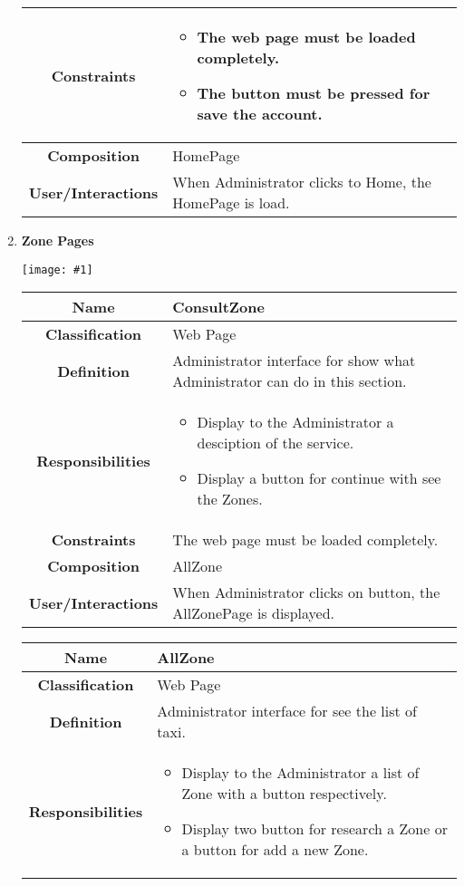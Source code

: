 \documentclass[11pt, a4paper,titlepage]{article}
\newcommand{\image}[1]{
	\begin{center}
		\noindent \texttt{[image: \#1]}
	\end{center}
	}
\begin{document}
\begin{enumerate}
\begin{tabularx}{\textwidth}{| c | X |}
	\hline
	\textbf{Constraints} &
	\begin{itemize}
		\item The web page must be loaded completely.
		\item The button must be pressed for save the account.
	\end{itemize}
	\\
	\hline
	\textbf{Composition} & HomePage
	\\
	\hline
	\textbf{User/Interactions} & When Administrator clicks to Home, the HomePage is load.
	\\
	\hline 
\end{tabularx}
\newpage
\item \textbf{Zone Pages}\\
\image{page_zone.png}
\begin{tabularx}{\textwidth}{| c | X |}
	\hline
	\textbf{Name} &
	ConsultZone
	\\
	\hline
	\textbf{Classification} &
	Web Page
	\\
	\hline
	\textbf{Definition} &
	Administrator interface for show what Administrator can do in this section.\\
	\hline
	\textbf{Responsibilities} &
	\begin{itemize}
		\item Display to the Administrator a desciption of the service.
		\item Display a button for continue with see the Zones.
	\end{itemize}
	\\
	\hline
	\textbf{Constraints} & The web page must be loaded completely.
	\\
	\hline
	\textbf{Composition} &
	AllZone
	\\
	\hline
	\textbf{User/Interactions} &
	When Administrator clicks on button, the AllZonePage is displayed.
	\\
	\hline 
\end{tabularx}
\begin{tabularx}{\textwidth}{| c | X |}
	\hline
	\textbf{Name} &
	AllZone
	\\
	\hline
	\textbf{Classification} &
	Web Page
	\\
	\hline
	\textbf{Definition} &
	Administrator interface for see the list of taxi.\\
	\hline
	\textbf{Responsibilities} &
	\begin{itemize}
		\item Display to the Administrator a list of Zone with a button respectively.
		\item Display two button for research a Zone or a button for add a new Zone.

\end{itemize}
\end{tabularx}
\end{enumerate}
\end{document}
